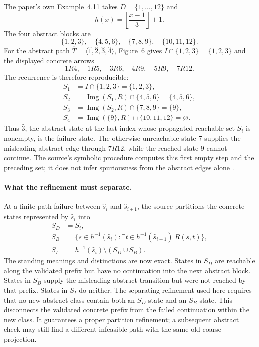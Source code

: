 The paper's own Example~4.11 takes
\(D=\{1,\ldots,12\}\) and
\[
 h(x)=\left\lfloor\frac{x-1}{3}\right\rfloor+1.
\]
The four abstract blocks are
\[
 \{1,2,3\},\quad\{4,5,6\},\quad
 \{7,8,9\},\quad\{10,11,12\}.
\]
For the abstract path
\(\widehat T=\langle\widehat{1},\widehat{2},\widehat{3},\widehat{4}\rangle\),
Figure~6 gives
\(I\cap\{1,2,3\}=\{1,2,3\}\) and the displayed concrete arrows
\[
 1R4,\quad 1R5,\quad 3R6,\quad
 4R9,\quad 5R9,\quad 7R12.
\]
The recurrence is therefore reproducible:
\[
\begin{aligned}
 S_1&=I\cap\{1,2,3\}=\{1,2,3\},\\
 S_2&=\operatorname{Img}(S_1,R)\cap\{4,5,6\}
       =\{4,5,6\},\\
 S_3&=\operatorname{Img}(S_2,R)\cap\{7,8,9\}
       =\{9\},\\
 S_4&=\operatorname{Img}(\{9\},R)\cap\{10,11,12\}
       =\varnothing.
\end{aligned}
\]
Thus \(\widehat{3}\), the abstract state at the last index whose propagated
reachable set \(S_i\) is nonempty, is the failure state.  The otherwise
unreachable state \(7\) supplies the misleading abstract edge through
\(7R12\), while the reached state \(9\) cannot continue.  The source's
symbolic procedure computes this first empty step and the preceding set; it
does not infer spuriousness from the abstract edges alone
\cite[ex.~4.11 and fig.~6]{ClarkeEtAl2003}.

\paragraph{What the refinement must separate.}
At a finite-path failure between \(\widehat s_i\) and
\(\widehat s_{i+1}\), the source partitions the concrete states represented by
\(\widehat s_i\) into
\[
\begin{aligned}
 S_D&=S_i,\\
 S_B&=\{s\in h^{-1}(\widehat s_i):
       \exists t\in h^{-1}(\widehat s_{i+1})\ R(s,t)\},\\
 S_I&=h^{-1}(\widehat s_i)\setminus(S_D\cup S_B).
\end{aligned}
\]
The standing meanings and distinctions are now exact.  States in \(S_D\) are
reachable along the validated prefix but have no continuation into the next
abstract block.  States in \(S_B\) supply the misleading abstract transition
but were not reached by that prefix. States in \(S_I\) do neither.
The separating refinement used here requires that no new abstract class
contain both an \(S_D\)-state and an \(S_B\)-state. This disconnects the
validated concrete prefix from the failed continuation within the new class.
It guarantees a proper partition refinement; a subsequent abstract check
may still find a different infeasible path with the same old coarse
projection.


